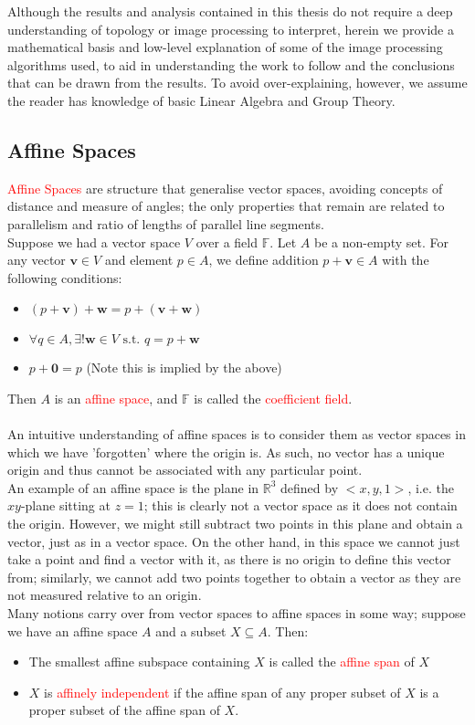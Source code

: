 \documentclass[a4paper]{article}
\begin{document}
Although the results and analysis contained in this thesis do not require a deep understanding of topology or image processing to interpret, herein we provide a mathematical basis and low-level explanation of some of the image processing algorithms used, to aid in understanding the work to follow and the conclusions that can be drawn from the results. To avoid over-explaining, however, we assume the reader has knowledge of basic Linear Algebra and Group Theory.

\subsection*{Affine Spaces}
\textcolor{red}{Affine Spaces} are structure that generalise vector spaces, avoiding concepts of distance and measure of angles; the only properties that remain are related to parallelism and ratio of lengths of parallel line segments.
\\
Suppose we had a vector space $V$ over a field $\mathbb{F}$. Let $A$ be a non-empty set. For any vector $\textbf{v} \in V$ and element $p \in A$, we define addition $p + \textbf{v} \in A$ with the following conditions:
\begin{itemize}
\item $(p + \textbf{v}) + \textbf{w} = p + (\textbf{v} + \textbf{w})$
\item $\forall q \in A, \exists! \textbf{w} \in V \text{ s.t. } q = p + \textbf{w}$
\item $p + \textbf{0} = p$ (Note this is implied by the above)
\end{itemize}
Then $A$ is an \textcolor{red}{affine space}, and $\mathbb{F}$ is called the \textcolor{red}{coefficient field}.
\\
\\
An intuitive understanding of affine spaces is to consider them as vector spaces in which we have 'forgotten' where the origin is. As such, no vector has a unique origin and thus cannot be associated with any particular point.
\\
An example of an affine space is the plane in $\mathbb{R}^{3}$ defined by $<x, y, 1>$, i.e. the $xy$-plane sitting at $z = 1$; this is clearly not a vector space as it does not contain the origin. However, we might still subtract two points in this plane and obtain a vector, just as in a vector space. On the other hand, in this space we cannot just take a point and find a vector with it, as there is no origin to define this vector from; similarly, we cannot add two points together to obtain a vector as they are not measured relative to an origin.
\\
Many notions carry over from vector spaces to affine spaces in some way; suppose we have an affine space $A$ and a subset $X \subseteq A$. Then:
\begin{itemize}
\item The smallest affine subspace containing $X$ is called the \textcolor{red}{affine span} of $X$
\item $X$ is \textcolor{red}{affinely independent} if the affine span of any proper subset of $X$ is a proper subset of the affine span of $X$.
\end{itemize}
\end{document}
